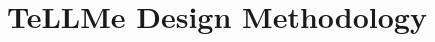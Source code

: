 \documentclass[sigconf]{acmart}
\begin{document}
\section{TeLLMe Design Methodology}

\end{document}
